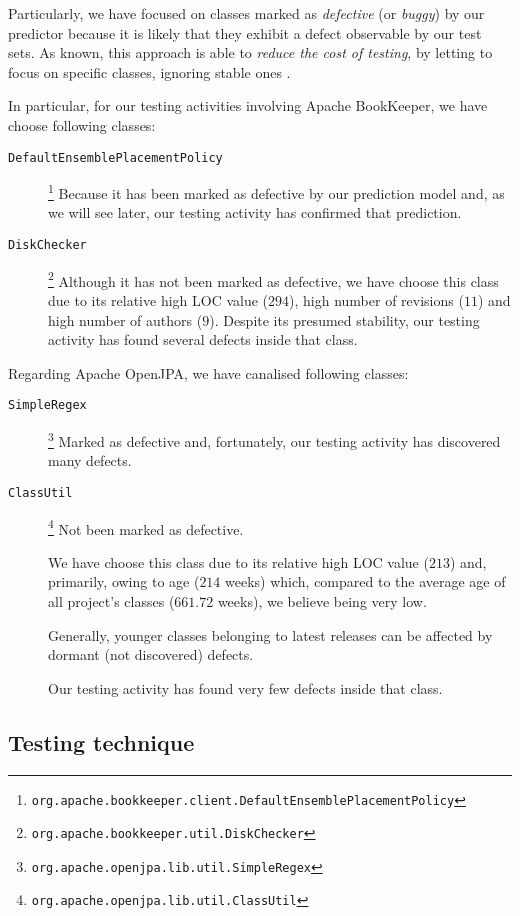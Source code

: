 \documentclass[sigconf]{acmart}
\begin{document}
Particularly, we have focused on classes marked as \textit{defective} (or \textit{buggy}) by our predictor because it is likely that they exhibit a defect observable by our test sets. As known, this approach is able to \textit{reduce the cost of testing}, by letting to focus on specific classes, ignoring stable ones \cite{Falessi}.

In particular, for our testing activities involving Apache BookKeeper\texttrademark, we have choose following classes:
\begin{description}
\item[\texttt{DefaultEnsemblePlacementPolicy}]\footnote{\texttt{org.apache.bookkeeper.client.DefaultEnsemblePlacementPolicy}} Because it has been marked as defective by our prediction model and, as we will see later, our testing activity has confirmed that prediction.
\item[\texttt{DiskChecker}]\footnote{\texttt{org.apache.bookkeeper.util.DiskChecker}} Although it has not been marked as defective, we have choose this class due to its relative high LOC value ($294$), high number of revisions ($11$) and high number of authors ($9$). Despite its presumed stability, our testing activity has found several defects inside that class. 
\end{description}

Regarding Apache OpenJPA\texttrademark, we have canalised following classes:

\begin{description}
\item[\texttt{SimpleRegex}]\footnote{\texttt{org.apache.openjpa.lib.util.SimpleRegex}} Marked as defective and, fortunately, our testing activity has discovered many defects.
\item[\texttt{ClassUtil}]\footnote{\texttt{org.apache.openjpa.lib.util.ClassUtil}} Not been marked as defective. 

We have choose this class due to its relative high LOC value ($213$) and, primarily, owing to age ($214$ weeks)  which, compared to the average age of all project's classes ($661.72$ weeks), we believe being very low. 

Generally, younger classes belonging to latest releases can be affected by dormant (not discovered) defects\cite{Falessi}.

Our testing activity has found very few defects inside that class. 
\end{description}

\subsection{Testing technique}
\end{document}
